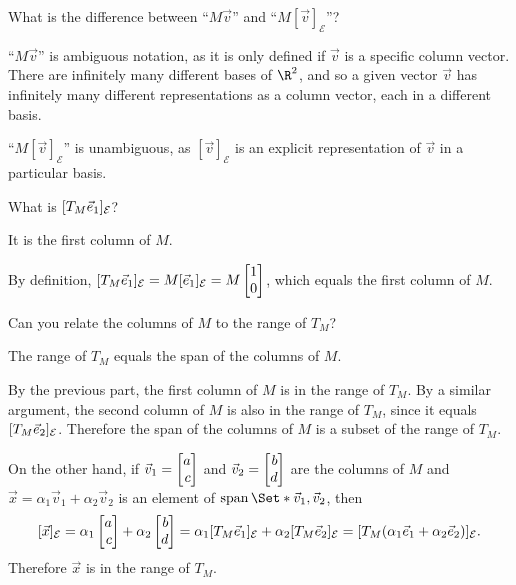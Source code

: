 	\begin{parts}
		\item What is the difference between
			``$M\vec v$'' and ``$M[\vec v]_{\mathcal E}$''?
			\begin{solution}
				``$M\vec v$'' is ambiguous notation, as it is only defined if
				$\vec v$ is a specific column vector. There are infinitely many
				different bases of $\R^2$, and so a given vector $\vec v$ has
				infinitely many different representations as a column vector,
				each in a different basis.

				``$M[\vec v]_{\mathcal E}$'' is unambiguous, as
				$[\vec v]_{\mathcal E}$ is an explicit representation of $\vec v$
				in a particular basis.
			\end{solution}
		\item What is $[T_M{\vec e_1}]_{\mathcal E}$?
			\begin{solution}
				It is the first column of $M$.

				By definition,
				$[T_M\xhat]_{\mathcal E}=M[\xhat]_{\mathcal E}=M\mat{1\\0}$,
				which equals the first column of $M$.
			\end{solution}
		\item \label{inducedTransform.3}
			Can you relate the columns of $M$ to the range of $T_M$?
			\begin{solution}
				The range of $T_M$ equals the span of the columns of $M$.

				By the previous part, the first column of $M$ is in the range of
				$T_M$. By a similar argument, the second column of $M$ is also
				in the range of $T_M$, since it equals $[T_M{\vec e_2}]_{\mathcal E}$.
				Therefore the span of the columns of $M$ is a subset of the range
				of $T_M$.

				On the other hand, if $\vec v_1=\mat{a\\c}$ and $\vec v_2=\mat{b\\d}$
				are the columns of $M$ and $\vec x = \alpha_1\vec v_1+\alpha_2\vec v_2$
				is an element of $\Span\Set*{\vec v_1,\vec v_2}$, then
				\[
					[\vec x]_{\mathcal E}
					=\alpha_1\mat{a\\c}+\alpha_2\mat{b\\d}
					=\alpha_1[T_M\xhat]_{\mathcal E}+\alpha_2[T_M\yhat]_{\mathcal E}
					=[T_M(\alpha_1\xhat+\alpha_2\yhat)]_{\mathcal E}.
				\]
				Therefore $\vec x$ is in the range of $T_M$.
			\end{solution}
	\end{parts}



